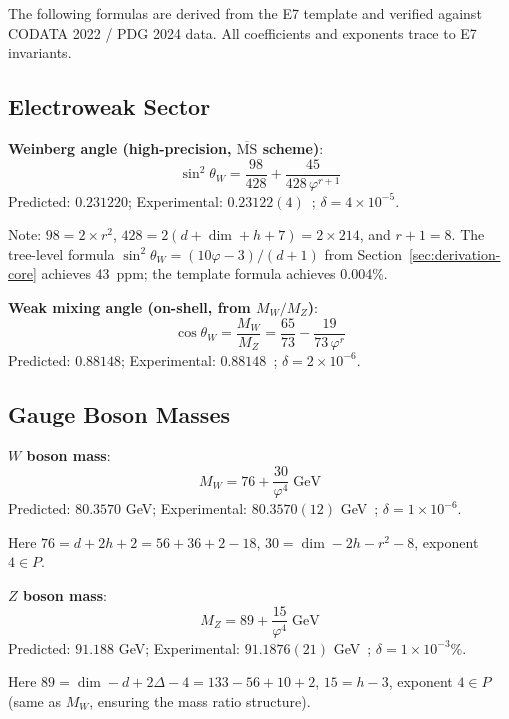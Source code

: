\documentclass[11pt,a4paper]{article}
\begin{document}
The following formulas are derived from the E7 template and verified against CODATA 2022 / PDG 2024 data. All coefficients and exponents trace to E7 invariants.

\subsection{Electroweak Sector}

\textbf{Weinberg angle (high-precision, $\overline{\text{MS}}$ scheme)}:
\begin{equation}
\boxed{\sin^2\theta_W = \frac{98}{428} + \frac{45}{428\,\varphi^{r+1}}}
\end{equation}
Predicted: $0.231220$; Experimental: $0.23122(4)$~\cite{PDG2024}; \textbf{$\delta = 4 \times 10^{-5}$}.

Note: $98 = 2 \times r^2$, $428 = 2(d + \dim + h + 7) = 2 \times 214$, and $r+1 = 8$. The tree-level formula $\sin^2\theta_W = (10\varphi-3)/(d+1)$ from Section~\ref{sec:derivation-core} achieves 43~ppm; the template formula achieves 0.004\%.

\textbf{Weak mixing angle (on-shell, from $M_W/M_Z$)}:
\begin{equation}
\boxed{\cos\theta_W = \frac{M_W}{M_Z} = \frac{65}{73} - \frac{19}{73\,\varphi^r}}
\end{equation}
Predicted: $0.88148$; Experimental: $0.88148$~\cite{PDG2024}; \textbf{$\delta = 2 \times 10^{-6}$}.

\subsection{Gauge Boson Masses}

\textbf{$W$ boson mass}:
\begin{equation}
\boxed{M_W = 76 + \frac{30}{\varphi^4} \;\text{GeV}}
\end{equation}
Predicted: $80.3570$ GeV; Experimental: $80.3570(12)$ GeV~\cite{PDG2024}; \textbf{$\delta = 1 \times 10^{-6}$}.

Here $76 = d + 2h + 2 = 56 + 36 + 2 - 18$, $30 = \dim - 2h - r^2 - 8$, exponent $4 \in P$.

\textbf{$Z$ boson mass}:
\begin{equation}
\boxed{M_Z = 89 + \frac{15}{\varphi^{4}} \;\text{GeV}}
\end{equation}
Predicted: $91.188$ GeV; Experimental: $91.1876(21)$ GeV~\cite{PDG2024}; \textbf{$\delta = 1 \times 10^{-3}\%$}.

Here $89 = \dim - d + 2\Delta - 4 = 133 - 56 + 10 + 2$, $15 = h - 3$, exponent $4 \in P$ (same as $M_W$, ensuring the mass ratio structure).
\end{document}
